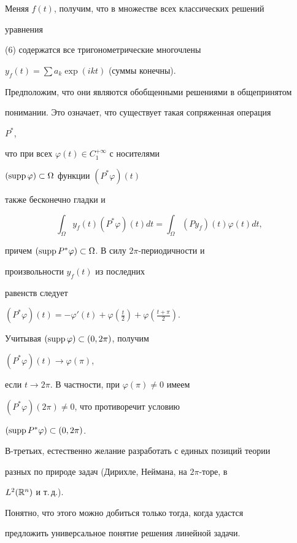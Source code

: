 Меняя $f(t)$, получим, что в множестве всех классических решений 


уравнения 


(6) содержатся все тригонометрические многочлены 


$y_f(t)=\sum{}a_k\exp(ikt)$ (суммы конечны). 


Предположим, что они являются обобщенными решениями в общепринятом 


понимании. Это означает, что существует такая сопряженная операция 


$P^*$, 


что при всех $\varphi(t)\in C^{+\infty}_1$ с носителями 


$(\operatorname{supp}\varphi)\subset\Omega$ функции $(P^*\varphi)(t)$ 


также бесконечно гладки и 


$$ 


\int_\Omega y_f(t)(P^*\varphi)(t)dt= 


\int_\Omega(P y_f)(t)\varphi(t)dt, 


$$ 


причем $(\operatorname{supp} P^*\varphi)\subset\Omega$. В силу $2\pi$-периодичности и 


произвольности $y_f(t)$ из последних 


равенств следует 


$(P^*\varphi)(t)=-\varphi'(t)+\varphi\left(\frac{t}{2}\right)+ 


\varphi\left(\frac{t+\pi}{2}\right)$. 


Учитывая $(\operatorname{supp}\varphi)\subset(0,2\pi)$, получим 


$(P^*\varphi)(t)\to\varphi(\pi)$, 


если $t\to 2\pi$. В частности, при $\varphi(\pi)\ne 0$ имеем 


$(P^*\varphi)(2\pi)\ne 0$, что противоречит условию 


$(\operatorname{supp} P^*\varphi)\subset(0,2\pi)$. 


 


В-третьих, естественно желание разработать с единых позиций теории 


разных по природе задач (Дирихле, Неймана, на $2\pi$-торе, в 


$L^2(\Bbb R^n)$ и т.\,д.). 


Понятно, что этого можно добиться только тогда, когда удастся 


предложить универсальное понятие решения линейной задачи.  


